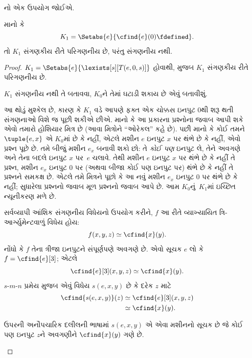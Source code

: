 નો એક ઉપયોગ જોઈએ.

\begin{prop}
માનો કે
\[
K_1 = \Setabs{e}{\cfind{e}(0) \fdefined}.
\]
તો $K_1$ સંગણકીય રીતે પરિગણનીય છે, પરંતુ સંગણનીય નથી.
\end{prop}

\begin{proof}
$K_1 = \Setabs{e}{\lexists[s][T(e,0,s)]}$ હોવાથી,
 મુજબ $K_1$ સંગણકીય રીતે
પરિગણનીય છે.

$K_1$ સંગણનીય નથી તે બતાવવા, $K_0$ને તેમાં ઘટાડી શકાય
છે એવું બતાવીશું.

\begin{explain}
આ થોડું મુશ્કેલ છે, કારણ કે $K_1$ વડે આપણે ફક્ત એક
ચોક્કસ ઇનપુટ $0$થી શરૂ થતી સંગણનાઓ વિશે જ પૂછી શકીએ છીએ.
માનો કે આ પ્રકારના પ્રશ્નોના જવાબ આપી શકે એવો તમારો હોશિયાર
મિત્ર છે (આવા મિત્રોને ``ઓરેકલ'' કહે છે). પછી માનો કે
કોઈ તમને $\tuple{e, x}$ એ $K_0$માં છે કે નહીં,
એટલે મશીન $e$ ઇનપુટ $x$ પર થંભે છે કે નહીં, એવો પ્રશ્ન
પૂછે છે. તમે બીજું મશીન $e_x$ બનાવી શકો છો: તે
\emph{કોઈ પણ} ઇનપુટ લે, તેને અવગણે અને તેના બદલે
ઇનપુટ $x$ પર~$e$ ચલાવે. તેથી મશીન $e$ ઇનપુટ $x$ પર
થંભે છે કે નહીં તે પ્રશ્ન, મશીન $e_x$ ઇનપુટ $0$ પર
(અથવા બીજા કોઈ પણ ઇનપુટ પર) થંભે છે કે નહીં તે પ્રશ્નને
સમકક્ષ છે. એટલે તમે મિત્રને પૂછો કે આ નવું મશીન $e_x$
ઇનપુટ $0$ પર થંભે છે કે નહીં; સુધારેલા પ્રશ્નનો જવાબ
મૂળ પ્રશ્નનો જવાબ આપે છે. આમ $K_0$નું~$K_1$માં ઇચ્છિત
ન્યૂનીકરણ મળે છે.
\end{explain}

સર્વવ્યાપી આંશિક સંગણનીય વિધેયનો ઉપયોગ કરીને, $f$ આ રીતે
વ્યાખ્યાયિત ત્રિ-આર્ગ્યુમેન્ટવાળું વિધેય હોય:
\[
f(x,y,z) \simeq \cfind{x}(y).
\]
નોંધો કે $f$ તેના ત્રીજા ઇનપુટને સંપૂર્ણપણે અવગણે છે.
એવો સૂચક $e$ લો કે $f = \cfind{e}[3]$; એટલે
\[
\cfind{e}[3](x,y,z) \simeq \cfind{x}(y).
\]
$s$-$m$-$n$ પ્રમેય મુજબ એવું વિધેય $s(e,x,y)$ છે કે
દરેક $z$ માટે
\begin{align*}
\cfind{s(e,x,y)}(z) & \simeq \cfind{e}[3](x,y,z) \\
& \simeq \cfind{x}(y).
\end{align*}

\begin{explain}
ઉપરની અનૌપચારિક દલીલની ભાષામાં $s(e,x,y)$ એ એવા મશીનનો
સૂચક છે જે કોઈ પણ ઇનપુટ $z$ને અવગણીને $\cfind{x}(y)$
ગણે છે.
\end{explain}


\end{proof}
